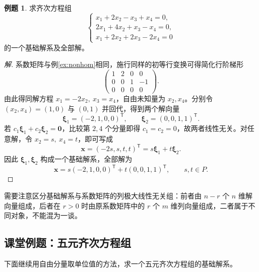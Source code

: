 \documentclass[UTF8, fontset=fandol, a4paper, 12pt]{ctexart}
\newcommand{\vx}{\boldsymbol{x}}
\newcommand{\vo}{\boldsymbol{0}}
\newcommand{\vxi}{\boldsymbol{\xi}}
\theoremstyle{definition}
\newtheorem{example}[definition]{例题}
\begin{document}
\begin{example}\label{ex:hom}
求齐次方程组
\[
 \begin{cases}
 x_1+2x_2-x_3+x_4=0,\\
 2x_1+4x_2+x_3-x_4=0,\\
 x_1+2x_2+2x_3-2x_4=0
 \end{cases}
\]
的一个基础解系及全部解。
\end{example}
\begin{proof}[解]
系数矩阵与例\ref{ex:nonhom}相同，施行同样的初等行变换可得简化行阶梯形
\[
 \begin{pmatrix}1&2&0&0\\0&0&1&-1\\0&0&0&0\end{pmatrix}.
\]
由此得同解方程 $x_1=-2x_2,\ x_3=x_4$，自由未知量为 $x_2,x_4$。分别令 $(x_2,x_4)=(1,0)$ 与 $(0,1)$ 并回代，得到两个解向量
\[
 \vxi_1=(-2,1,0,0)^{\mathsf T},\qquad
 \vxi_2=(0,0,1,1)^{\mathsf T}.
\]
若 $c_1\vxi_1+c_2\vxi_2=\vo$，比较第 $2,4$ 个分量即得 $c_1=c_2=0$，故两者线性无关。对任意解，令 $x_2=s,\ x_4=t$，即可写成
\[
 \vx=(-2s,s,t,t)^{\mathsf T}=s\vxi_1+t\vxi_2.
\]
因此 $\vxi_1,\vxi_2$ 构成一个基础解系，全部解为
\[
 \boxed{\vx=s(-2,1,0,0)^{\mathsf T}+t(0,0,1,1)^{\mathsf T},\qquad s,t\in P.}
\]
\end{proof}

需要注意区分基础解系与系数矩阵的列极大线性无关组：前者由 $n-r$ 个 $n$ 维解向量组成，后者在 $r>0$ 时由原系数矩阵中的 $r$ 个 $m$ 维列向量组成，二者属于不同对象，不能混为一谈。

\subsection{课堂例题：五元齐次方程组}

下面继续用自由分量取单位值的方法，求一个五元齐次方程组的基础解系。
\end{document}
